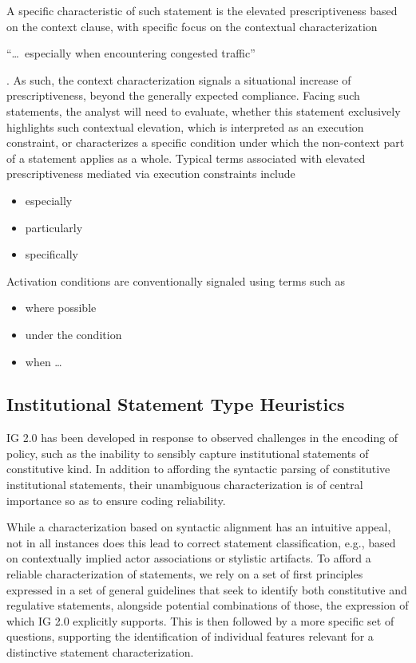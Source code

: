 A specific characteristic of such statement is the elevated prescriptiveness based on the context clause, with specific focus on the contextual characterization \begin{exi}``\dots~especially when encountering congested traffic''\end{exi}. As such, the context characterization signals a situational increase of prescriptiveness, beyond the generally expected compliance. Facing such statements, the analyst will need to evaluate, whether this statement exclusively highlights such contextual elevation, which is interpreted as an execution constraint, or characterizes a specific condition under which the non-context part of a statement applies as a whole. Typical terms associated with elevated prescriptiveness mediated via execution constraints include 

\begin{itemize}
    \item especially
    \item particularly
    \item specifically
\end{itemize}

Activation conditions are conventionally signaled using terms such as

\begin{itemize}
    \item where possible
    \item under the condition
    \item when \dots
\end{itemize}



\newpage

\subsection{Institutional Statement Type Heuristics}
\label{subsec:StatementTypesHeuristics}

IG 2.0 has been developed in response to observed challenges in the encoding of policy, such as the inability to sensibly capture institutional statements of constitutive kind. In addition to affording the syntactic parsing of constitutive institutional statements, their unambiguous characterization is of central importance so as to ensure coding reliability.

While a characterization based on syntactic alignment has an intuitive appeal, not in all instances does this lead to correct statement classification, e.g., based on contextually implied actor associations or stylistic artifacts. To afford a reliable characterization of statements, we rely on a set of first principles expressed in a set of general guidelines that seek to identify both constitutive and regulative statements, alongside potential combinations of those, the expression of which IG 2.0 explicitly supports. This is then followed by a more specific set of questions, supporting the identification of individual features relevant for a distinctive statement characterization.

